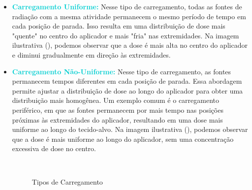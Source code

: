 \documentclass[11pt,a4paper]{article}
\newcounter{exemplo}
\begin{document}
			\begin{itemize}
				\item \textcolor{DarkTurquoise}{\textbf{Carregamento Uniforme:}} Nesse tipo de carregamento, todas as fontes de radiação com a mesma atividade permanecem o mesmo período de tempo em cada posição de parada. Isso resulta em uma distribuição de dose mais "quente"  no centro do aplicador e mais "fria" nas extremidades. Na imagem ilustrativa (), podemos observar que a dose é mais alta no centro do aplicador e diminui gradualmente em direção às extremidades.
				

				\item \textcolor{DarkTurquoise}{\textbf{Carregamento Não-Uniforme:}} Nesse tipo de carregamento, as fontes permanecem tempos diferentes em cada posição de parada. Essa abordagem permite ajustar a distribuição de dose ao longo do aplicador para obter uma distribuição mais homogênea. Um exemplo comum é o carregamento periférico, em que as fontes permanecem por mais tempo nas posições próximas às extremidades do aplicador, resultando em uma dose mais uniforme ao longo do tecido-alvo. Na imagem ilustrativa (), podemos observar que a dose é mais uniforme ao longo do aplicador, sem uma concentração excessiva de dose no centro.
				
			
					\begin{figure}[h]
						\centering
						 \\ %
						\caption{Tipos de Carregamento}
						\label{fig:tiposDeCarregamentos}
					\end{figure}
			\end{itemize}
		
\end{document}

